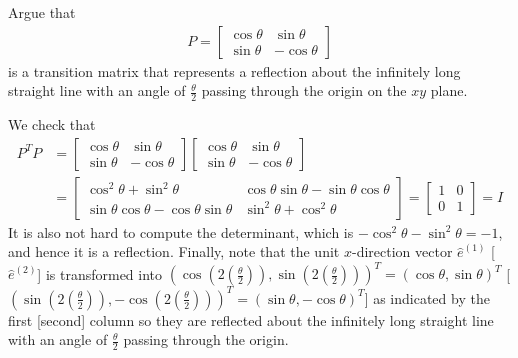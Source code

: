 \begin{Exercise}
Argue that
\begin{align*}
P = 
\begin{bmatrix}
\cos{\theta} & \sin{\theta} \\
\sin{\theta} & -\cos{\theta}
\end{bmatrix}
\end{align*}
is a transition matrix that represents a reflection about the infinitely long straight line with an angle of $\frac{\theta}{2}$ passing through the origin on the $xy$ plane.
\end{Exercise}
\begin{Answer}
We check that
\begin{align*}
P^TP &= 
\begin{bmatrix}
\cos{\theta} & \sin{\theta} \\
\sin{\theta} & -\cos{\theta}
\end{bmatrix}
\begin{bmatrix}
\cos{\theta} & \sin{\theta} \\
\sin{\theta} & -\cos{\theta}
\end{bmatrix} \\
&=
\begin{bmatrix}
\cos^2{\theta} + \sin^2\theta & \cos\theta\sin\theta -\sin\theta\cos\theta \\
\sin\theta\cos\theta-\cos\theta\sin\theta & \sin^2\theta + \cos^2\theta
\end{bmatrix}
=
\begin{bmatrix}
1 & 0\\
0 & 1
\end{bmatrix}
= I
\end{align*}
It is also not hard to compute the determinant, which is $-\cos^2\theta-\sin^2\theta = -1$, and hence it is a reflection. Finally, note that the unit $x$-direction vector $\hat{e}^{(1)}$ [$\hat{e}^{(2)}$] is transformed into $(\cos(2(\frac{\theta}{2})), \sin(2(\frac{\theta}{2})))^T = (\cos\theta, \sin\theta)^T$ [$(\sin(2(\frac{\theta}{2})), -\cos(2(\frac{\theta}{2})))^T = (\sin\theta,-\cos\theta)^T$] as indicated by the first [second] column so they are reflected about the infinitely long straight line with an angle of $\frac{\theta}{2}$ passing through the origin.
\end{Answer}

